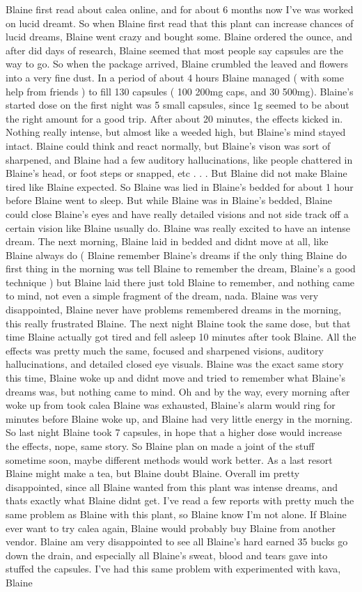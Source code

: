 \documentclass[12pt]{book}
\begin{document}
Blaine first read about calea online, and for about 6 months now I've was worked on lucid dreamt. So when Blaine first read that this plant can increase chances of lucid dreams, Blaine went crazy and bought some. Blaine ordered the ounce, and after did days of research, Blaine seemed that most people say capsules are the way to go. So when the package arrived, Blaine crumbled the leaved and flowers into a very fine dust. In a period of about 4 hours Blaine managed ( with some help from friends ) to fill 130 capsules ( 100 200mg caps, and 30 500mg). Blaine's started dose on the first night was 5 small capsules, since 1g seemed to be about the right amount for a good trip. After about 20 minutes, the effects kicked in. Nothing really intense, but almost like a weeded high, but Blaine's mind stayed intact. Blaine could think and react normally, but Blaine's vison was sort of sharpened, and Blaine had a few auditory hallucinations, like people chattered in Blaine's head, or foot steps or snapped, etc . . .  But Blaine did not make Blaine tired like Blaine expected. So Blaine was lied in Blaine's bedded for about 1 hour before Blaine went to sleep. But while Blaine was in Blaine's bedded, Blaine could close Blaine's eyes and have really detailed visions and not side track off a certain vision like Blaine usually do. Blaine was really excited to have an intense dream. The next morning, Blaine laid in bedded and didnt move at all, like Blaine always do ( Blaine remember Blaine's dreams if the only thing Blaine do first thing in the morning was tell Blaine to remember the dream, Blaine's a good technique ) but Blaine laid there just told Blaine to remember, and nothing came to mind, not even a simple fragment of the dream, nada. Blaine was very disappointed, Blaine never have problems remembered dreams in the morning, this really frustrated Blaine. The next night Blaine took the same dose, but that time Blaine actually got tired and fell asleep 10 minutes after took Blaine. All the effects was pretty much the same, focused and sharpened visions, auditory hallucinations, and detailed closed eye visuals. Blaine was the exact same story this time, Blaine woke up and didnt move and tried to remember what Blaine's dreams was, but nothing came to mind. Oh and by the way, every morning after woke up from took calea Blaine was exhausted, Blaine's alarm would ring for minutes before Blaine woke up, and Blaine had very little energy in the morning. So last night Blaine took 7 capsules, in hope that a higher dose would increase the effects, nope, same story. So Blaine plan on made a joint of the stuff sometime soon, maybe different methods would work better. As a last resort Blaine might make a tea, but Blaine doubt Blaine. Overall im pretty disappointed, since all Blaine wanted from this plant was intense dreams, and thats exactly what Blaine didnt get. I've read a few reports with pretty much the same problem as Blaine with this plant, so Blaine know I'm not alone. If Blaine ever want to try calea again, Blaine would probably buy Blaine from another vendor. Blaine am very disappointed to see all Blaine's hard earned 35 bucks go down the drain, and especially all Blaine's sweat, blood and tears gave into stuffed the capsules. I've had this same problem with experimented with kava, Blaine 
\end{document}
